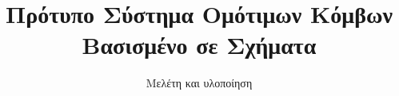 \documentclass{teipel-thesis}
\begin{document}
%
%
%
%
%
%
%
	\title{Πρότυπο Σύστημα Ομότιμων Κόμβων \\Βασισμένο σε Σχήματα }
%
%
%
	\subtitle{Μελέτη και υλοποίηση}
%
%
%	
	\toutis{του}
%
%
%
%
\end{document}
